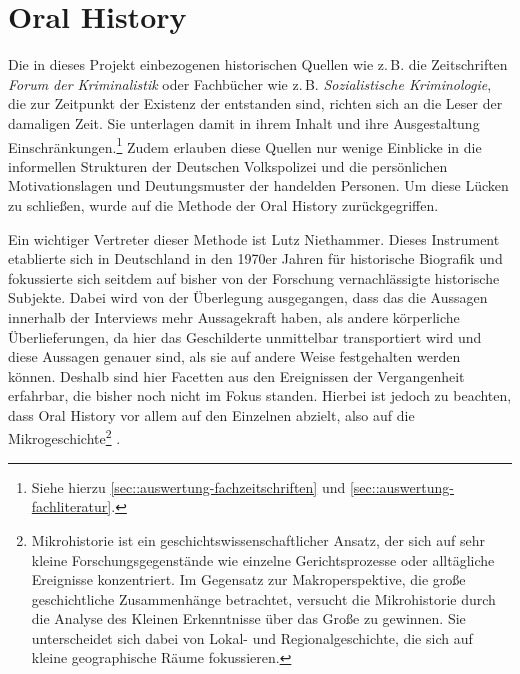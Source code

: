 \section{Oral History}
Die in dieses Projekt einbezogenen historischen Quellen wie z.\,B. die Zeitschriften \emph{Forum der Kriminalistik} oder Fachbücher wie z.\,B. \emph{Sozialistische Kriminologie}, die zur Zeitpunkt der Existenz der  entstanden sind, richten sich an die Leser der damaligen Zeit. 
Sie unterlagen damit in ihrem Inhalt und ihre Ausgestaltung Einschränkungen.\footnote{Siehe hierzu \cref{sec::auswertung-fachzeitschriften} und \cref{sec::auswertung-fachliteratur}.} 
Zudem erlauben diese Quellen nur wenige Einblicke in die informellen Strukturen der Deutschen Volkspolizei und die persönlichen Motivationslagen und Deutungsmuster der handelden Personen. %
Um diese Lücken zu schließen, wurde auf die Methode der Oral History zurückgegriffen.
\par 
\begin{quotation}
  \autocite[162]{Jordan2018}
\end{quotation}
Ein wichtiger Vertreter dieser Methode ist Lutz Niethammer.
Dieses Instrument etablierte sich in Deutschland in den 1970er Jahren für historische Biografik und fokussierte  sich seitdem auf bisher von der Forschung vernachlässigte historische Subjekte.\autocite[168]{Budde2008a} 
Dabei wird von der Überlegung ausgegangen, dass das die Aussagen innerhalb der Interviews mehr Aussagekraft haben, als andere körperliche Überlieferungen, da hier das Geschilderte unmittelbar transportiert wird und diese Aussagen genauer sind, als sie auf andere Weise festgehalten werden können.
Deshalb sind hier Facetten aus den Ereignissen der Vergangenheit erfahrbar, die bisher noch nicht im Fokus standen.\autocite[351]{Wagner2021} %
Hierbei ist jedoch zu beachten, dass Oral History vor allem auf den Einzelnen abzielt, also auf die Mikrogeschichte\footnote{Mikrohistorie ist ein geschichtswissenschaftlicher Ansatz, der sich auf sehr kleine Forschungsgegenstände wie einzelne Gerichtsprozesse oder alltägliche Ereignisse konzentriert. Im Gegensatz zur Makroperspektive, die große geschichtliche Zusammenhänge betrachtet, versucht die Mikrohistorie durch die Analyse des Kleinen Erkenntnisse über das Große zu gewinnen. Sie unterscheidet sich dabei von Lokal- und Regionalgeschichte, die sich auf kleine geographische Räume fokussieren.\textcite[158]{Jordan2018}} .
